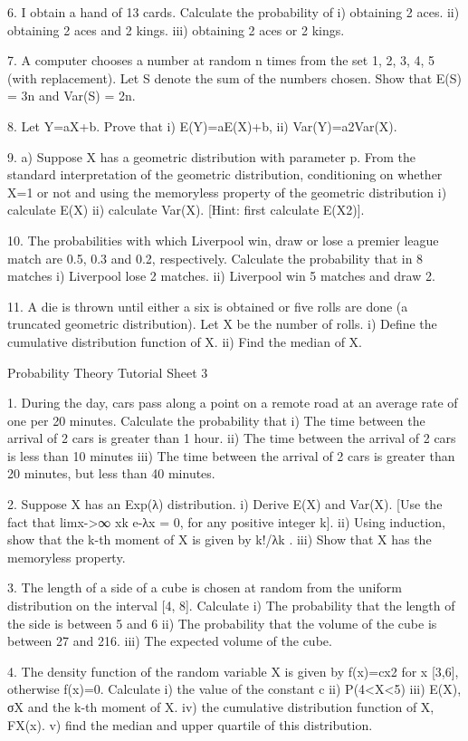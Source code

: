 \documentclass[]{report}
\begin{document}
	6.	I obtain a hand of 13 cards. Calculate the probability of
	i) obtaining 2 aces.
	ii) obtaining 2 aces and 2 kings.
	iii) obtaining 2 aces or 2 kings.
	
	7.  A computer chooses a number at random n times from the set {1, 2, 3, 4, 5} (with replacement). Let S denote the sum of the numbers chosen. Show that
	E(S) = 3n and Var(S) = 2n.
	
	8.	Let Y=aX+b. Prove that i) E(Y)=aE(X)+b, ii) Var(Y)=a2Var(X).
	
	9.	a) Suppose X has a geometric distribution with parameter p. From the standard interpretation of the geometric distribution, conditioning on whether X=1 or not and using the memoryless property of the geometric distribution
	i)	calculate E(X)
	ii)	calculate Var(X). [Hint: first calculate E(X2)].
	
	10.	The probabilities with which Liverpool win, draw or lose a premier league match are 0.5, 0.3 and 0.2, respectively. Calculate the probability that in 8 matches
	i)	Liverpool lose 2 matches.
	ii)	Liverpool win 5 matches and draw 2.
	
	11.	A die is thrown until either a six is obtained or five rolls are done (a truncated geometric distribution). Let X be the number of rolls.
	i)	Define the cumulative distribution function of X.
	ii)	Find the median of X.
	
	
	
	Probability Theory
	Tutorial Sheet 3
	
	1. During the day, cars pass along a point on a remote road at an average rate of one per 20 minutes. Calculate the probability that 
	i)	The time between the arrival of 2 cars is greater than 1 hour.
	ii)	The time between the arrival of 2 cars is less than 10 minutes 
	iii)	The time between the arrival of 2 cars is greater than 20 minutes, but less than 40 minutes. 
	
	2.	Suppose X has an Exp(λ) distribution.
	i)	Derive E(X) and Var(X). [Use the fact that limx->∞ xk e-λx = 0, for any positive integer k].
	ii)	Using induction, show that the k-th moment of X is given by k!/λk .
	iii) 	      Show that X has the memoryless property.
	
	3. The length of a side of a cube is chosen at random from the uniform distribution on 	the interval [4, 8]. Calculate
	i)	The probability that the length of the side is between 5 and 6
	ii)	The probability that the volume of the cube is between 27 and 216.
	iii)	The expected volume of the cube.
	
	4. The density function of the random variable X is given by f(x)=cx2 for x [3,6], 	otherwise f(x)=0. Calculate
	i)	the value of the constant c
	ii)	P(4<X<5)
	iii)	E(X), σX and the k-th moment of X.
	iv)	the cumulative distribution function of X, FX(x).
	v)	find the median and upper quartile of this distribution.
\end{document}
